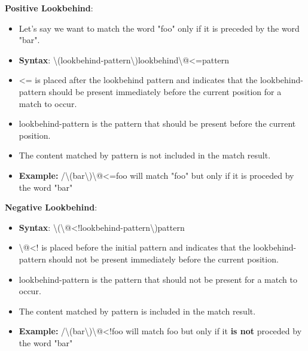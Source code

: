 \documentclass{report}
\begin{document}
    \bigbreak \noindent 
    \textbf{Positive Lookbehind}:
    \begin{itemize}
        \item Let's say we want to match the word "foo" only if it is preceded by the word "bar".
        \item \textbf{Syntax}: \textbackslash(lookbehind-pattern\textbackslash)lookbehind\textbackslash @<=pattern
        \item \@<= is placed after the lookbehind pattern and indicates that the lookbehind-pattern should be present immediately before the current position for a match to occur.
        \item lookbehind-pattern is the pattern that should be present before the current position.
        \item The content matched by pattern is not included in the match result.
        \item \textbf{Example:} /\textbackslash(bar\textbackslash)\textbackslash @<=foo will match "foo" but only if it is proceded by the word "bar"
    \end{itemize}

    \bigbreak \noindent 
    \textbf{Negative Lookbehind}:
    \begin{itemize}
        \item \textbf{Syntax}: \textbackslash(\textbackslash @<!lookbehind-pattern\textbackslash)pattern
        \item \textbackslash @<! is placed before the initial pattern and indicates that the lookbehind-pattern should not be present immediately before the current position.
        \item lookbehind-pattern is the pattern that should not be present for a match to occur.
        \item The content matched by pattern is included in the match result.
        \item \textbf{Example:} /\textbackslash(bar\textbackslash)\textbackslash @<!foo will match foo but only if it \textbf{is not} proceded by the word "bar"
    \end{itemize}




    \pagebreak
    \bigbreak
    \noindent
\end{document}
